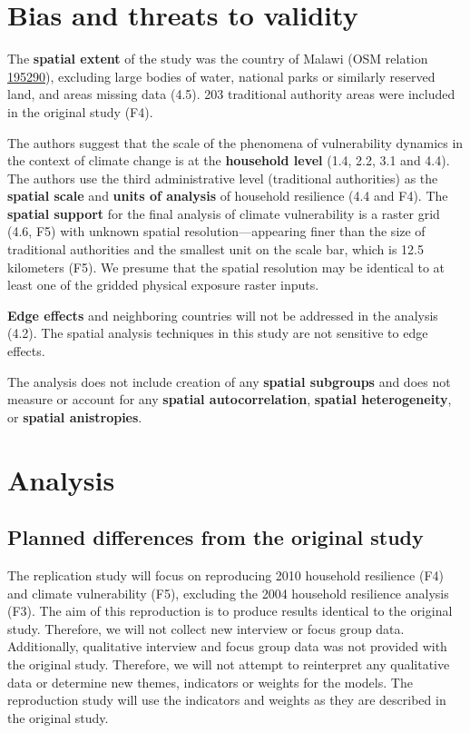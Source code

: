 \documentclass[
]{article}
\begin{document}
\hypertarget{bias-and-threats-to-validity}{%
\section{Bias and threats to
validity}\label{bias-and-threats-to-validity}}

The \textbf{spatial extent} of the study was the country of Malawi (OSM
relation \href{https://www.openstreetmap.org/relation/195290}{195290}),
excluding large bodies of water, national parks or similarly reserved
land, and areas missing data (4.5). 203 traditional authority areas were
included in the original study (F4).

The authors suggest that the scale of the phenomena of vulnerability
dynamics in the context of climate change is at the \textbf{household
level} (1.4, 2.2, 3.1 and 4.4). The authors use the third administrative
level (traditional authorities) as the \textbf{spatial scale} and
\textbf{units of analysis} of household resilience (4.4 and F4). The
\textbf{spatial support} for the final analysis of climate vulnerability
is a raster grid (4.6, F5) with unknown spatial resolution---appearing
finer than the size of traditional authorities and the smallest unit on
the scale bar, which is 12.5 kilometers (F5). We presume that the
spatial resolution may be identical to at least one of the gridded
physical exposure raster inputs.

\textbf{Edge effects} and neighboring countries will not be addressed in
the analysis (4.2). The spatial analysis techniques in this study are
not sensitive to edge effects.

The analysis does not include creation of any \textbf{spatial subgroups}
and does not measure or account for any \textbf{spatial
autocorrelation}, \textbf{spatial heterogeneity}, or \textbf{spatial
anistropies}.

\hypertarget{analysis}{%
\section{Analysis}\label{analysis}}

\hypertarget{planned-differences-from-the-original-study}{%
\subsection{Planned differences from the original
study}\label{planned-differences-from-the-original-study}}

The replication study will focus on reproducing 2010 household
resilience (F4) and climate vulnerability (F5), excluding the 2004
household resilience analysis (F3). The aim of this reproduction is to
produce results identical to the original study. Therefore, we will not
collect new interview or focus group data. Additionally, qualitative
interview and focus group data was not provided with the original study.
Therefore, we will not attempt to reinterpret any qualitative data or
determine new themes, indicators or weights for the models. The
reproduction study will use the indicators and weights as they are
described in the original study.
\end{document}
